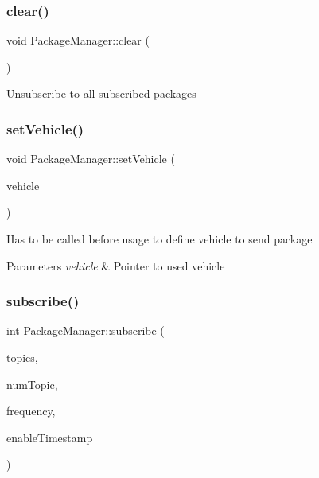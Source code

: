 \subsubsection{\texorpdfstring{clear()}{clear()}}
{\footnotesize\ttfamily void Package\+Manager\+::clear (\begin{DoxyParamCaption}{ }\end{DoxyParamCaption})}

Unsubscribe to all subscribed packages \mbox{\label{class_m210_1_1_package_manager_a6c89556663cb2b7484f5819557dc2534}} 
\subsubsection{\texorpdfstring{set\+Vehicle()}{setVehicle()}}
{\footnotesize\ttfamily void Package\+Manager\+::set\+Vehicle (\begin{DoxyParamCaption}\item[{const Vehicle $\ast$}]{vehicle }\end{DoxyParamCaption})}

Has to be called before usage to define vehicle to send package 
\begin{DoxyParams}{Parameters}
{\em vehicle} & Pointer to used vehicle \\
\hline
\end{DoxyParams}
\mbox{\label{class_m210_1_1_package_manager_a0448702a3c39e0fc75da71fdf72ebd30}} 
\subsubsection{\texorpdfstring{subscribe()}{subscribe()}}
{\footnotesize\ttfamily int Package\+Manager\+::subscribe (\begin{DoxyParamCaption}\item[{Topic\+Name $\ast$}]{topics,  }\item[{int}]{num\+Topic,  }\item[{uint16\+\_\+t}]{frequency,  }\item[{bool}]{enable\+Timestamp }\end{DoxyParamCaption})}

